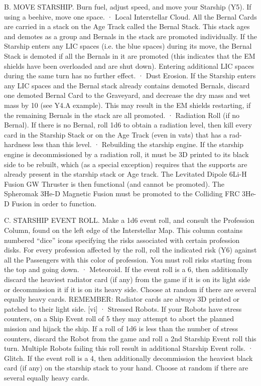 \documentclass[a4paper]{book}
\begin{document}
B. MOVE STARSHIP. Burn fuel, adjust speed, and move your Starship (Y5). If using a beehive, move one space.
·       Local Interstellar Cloud. All the Bernal Cards are carried in a stack on the Age Track called the Bernal Stack. This stack ages and demotes as a group and Bernals in the stack are promoted individually. If the Starship enters any LIC spaces (i.e. the blue spaces) during its move, the Bernal Stack is demoted if all the Bernals in it are promoted (this indicates that the EM shields have been overloaded and are shut down). Entering additional LIC spaces during the same turn has no further effect.
·       Dust Erosion. If the Starship enters any LIC spaces and the Bernal stack already contains demoted Bernals, discard one demoted Bernal Card to the Graveyard, and decrease the dry mass and wet mass by 10 (see Y4.A example). This may result in the EM shields restarting, if the remaining Bernals in the stack are all promoted.
·       Radiation Roll (if no Bernal). If there is no Bernal, roll 1d6 to obtain a radiation level, then kill every card in the Starship Stack or on the Age Track (even in vats) that has a rad-hardness less than this level.
·      Rebuilding the starship engine. If the starship engine is decommissioned by a radiation roll, it must be 3D printed to its black side to be rebuilt, which (as a special exception) requires that the supports are already present in the starship stack or Age track. The Levitated Dipole 6Li-H Fusion GW Thruster is then functional (and cannot be promoted). The Spheromak 3He-D Magnetic Fusion must be promoted to the Colliding FRC 3He-D Fusion in order to function.
 
C. STARSHIP EVENT ROLL. Make a 1d6 event roll, and consult the Profession Column, found on the left edge of the Interstellar Map. This column contains numbered “dice” icons specifying the risks associated with certain profession disks. For every profession affected by the roll, roll the indicated risk (Y6) against all the Passengers with this color of profession. You must roll risks starting from the top and going down.
·       Meteoroid. If the event roll is a 6, then additionally discard the heaviest radiator card (if any) from the game if it is on its light side or decommission it if it is on its heavy side. Choose at random if there are several equally heavy cards.
REMEMBER: Radiator cards are always 3D printed or patched to their light side. [vi]
·       Stressed Robots. If your Robots have stress counters, on a Ship Event roll of 5 they may attempt to abort the planned mission and hijack the ship. If a roll of 1d6 is less than the number of stress counters, discard the Robot from the game and roll a 2nd Starship Event roll this turn. Multiple Robots failing this roll result in additional Starship Event rolls.
·       Glitch. If the event roll is a 4, then additionally decommission the heaviest black card (if any) on the starship stack to your hand. Choose at random if there are several equally heavy cards.
\end{document}
